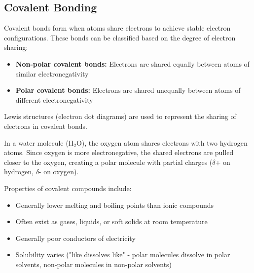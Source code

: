 
\subsection{Covalent Bonding}

Covalent bonds form when atoms share electrons to achieve stable electron configurations. These bonds can be classified based on the degree of electron sharing:

\begin{itemize}
    \item \textbf{Non-polar covalent bonds:} Electrons are shared equally between atoms of similar electronegativity
    \item \textbf{Polar covalent bonds:} Electrons are shared unequally between atoms of different electronegativity
\end{itemize}

Lewis structures (electron dot diagrams) are used to represent the sharing of electrons in covalent bonds.

\begin{example}
In a water molecule (H$_2$O), the oxygen atom shares electrons with two hydrogen atoms. Since oxygen is more electronegative, the shared electrons are pulled closer to the oxygen, creating a polar molecule with partial charges ($\delta$+ on hydrogen, $\delta$- on oxygen).
\end{example}

Properties of covalent compounds include:
\begin{itemize}
    \item Generally lower melting and boiling points than ionic compounds
    \item Often exist as gases, liquids, or soft solids at room temperature
    \item Generally poor conductors of electricity
    \item Solubility varies ("like dissolves like" - polar molecules dissolve in polar solvents, non-polar molecules in non-polar solvents)
\end{itemize}


